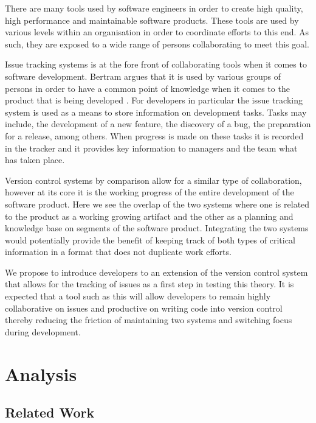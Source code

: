 \documentclass{mproj}
\begin{document}
There are many tools used by software engineers in order to create high quality, high performance and maintainable software products. These tools are used by various levels within an organisation in order to coordinate efforts to this end. As such, they are exposed to a wide range of persons collaborating to meet this goal.

Issue tracking systems is at the fore front of collaborating tools when it comes to software development. Bertram argues that it is used by various groups of persons in order to have a common point of knowledge when it comes to the product that is being developed \cite{Bertram:2010}. For developers in particular the issue tracking system is used as a means to store information on development tasks. Tasks may include, the development of a new feature, the discovery of a bug, the preparation for a release, among others. When progress is made on these tasks it is recorded in the tracker and it provides key information to managers and the team what has taken place.

Version control systems by comparison allow for a similar type of collaboration, however at its core it is the working progress of the entire development of the software product. Here we see the overlap of the two systems where one is related to the product as a working growing artifact and the other as a planning and knowledge base on segments of the software product. Integrating the two systems would potentially provide the benefit of keeping track of both types of critical information in a format that does not duplicate work efforts.

We propose to introduce developers to an extension of the version control system that allows for the tracking of issues as a first step in testing this theory. It is expected that a tool such as this will allow developers to remain highly collaborative on issues and productive on writing code into version control thereby reducing the friction of maintaining two systems and switching focus during development.

\chapter{Analysis}\label{analysis}

\section{Related Work}
\end{document}
